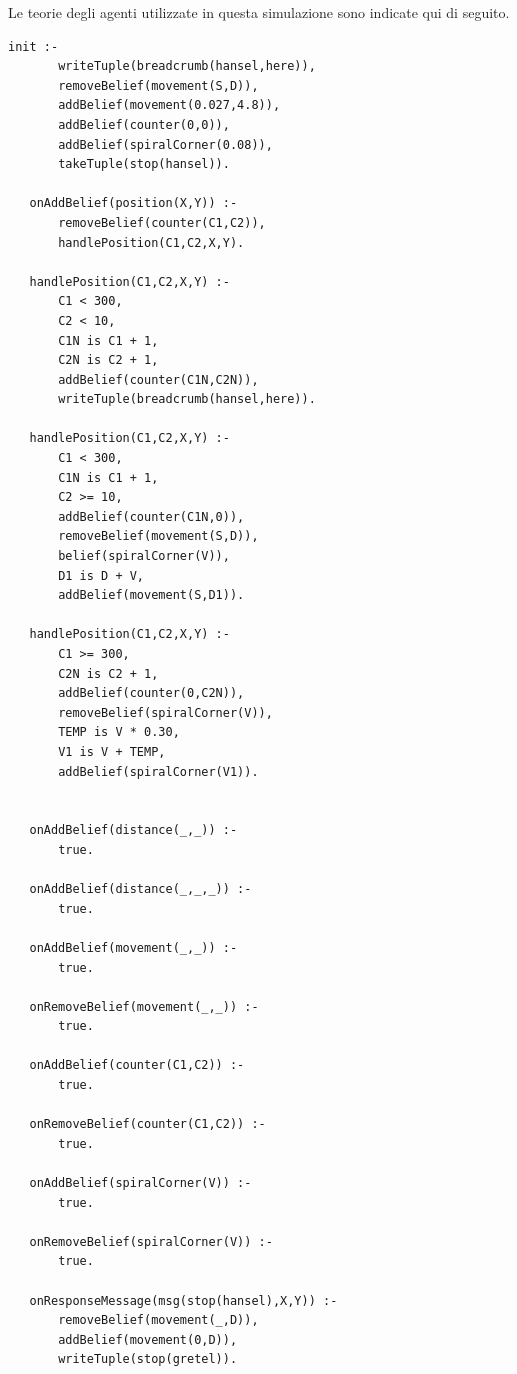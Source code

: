 \documentclass[12pt,a4paper,openright,twoside]{report}
\begin{document}
Le teorie degli agenti utilizzate in questa simulazione sono indicate qui di seguito.

\medskip
\begin{lstlisting}[firstnumber=1,label={lst:Hansel},caption={Teoria agente Hansel}]
   init :-
       writeTuple(breadcrumb(hansel,here)),
       removeBelief(movement(S,D)),
       addBelief(movement(0.027,4.8)),
       addBelief(counter(0,0)),
       addBelief(spiralCorner(0.08)),
       takeTuple(stop(hansel)).

   onAddBelief(position(X,Y)) :-
       removeBelief(counter(C1,C2)),
       handlePosition(C1,C2,X,Y).

   handlePosition(C1,C2,X,Y) :-
       C1 < 300,
       C2 < 10,
       C1N is C1 + 1,
       C2N is C2 + 1,
       addBelief(counter(C1N,C2N)),
       writeTuple(breadcrumb(hansel,here)).

   handlePosition(C1,C2,X,Y) :-
       C1 < 300,
       C1N is C1 + 1,
       C2 >= 10,
       addBelief(counter(C1N,0)),
       removeBelief(movement(S,D)),
       belief(spiralCorner(V)),
       D1 is D + V,
       addBelief(movement(S,D1)).

   handlePosition(C1,C2,X,Y) :-
       C1 >= 300,
       C2N is C2 + 1,
       addBelief(counter(0,C2N)),
       removeBelief(spiralCorner(V)),
       TEMP is V * 0.30,
       V1 is V + TEMP,
       addBelief(spiralCorner(V1)).


   onAddBelief(distance(_,_)) :-
       true.

   onAddBelief(distance(_,_,_)) :-
       true.

   onAddBelief(movement(_,_)) :-
       true.

   onRemoveBelief(movement(_,_)) :-
       true.

   onAddBelief(counter(C1,C2)) :-
       true.

   onRemoveBelief(counter(C1,C2)) :-
       true.

   onAddBelief(spiralCorner(V)) :-
       true.

   onRemoveBelief(spiralCorner(V)) :-
       true.

   onResponseMessage(msg(stop(hansel),X,Y)) :-
       removeBelief(movement(_,D)),
       addBelief(movement(0,D)),
       writeTuple(stop(gretel)).
\end{lstlisting}
\end{document}
